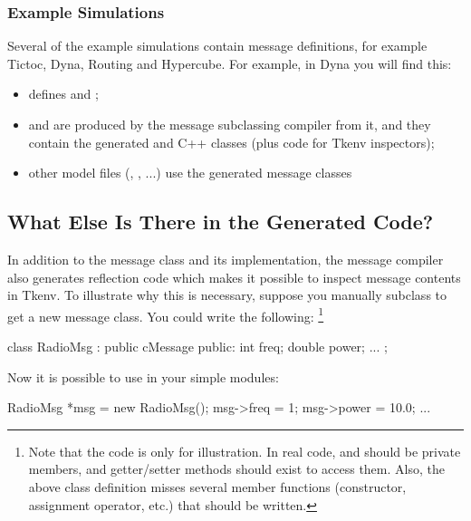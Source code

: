 \subsubsection{Example Simulations}

Several of the example simulations contain message definitions, for example
Tictoc, Dyna, Routing and Hypercube. For example, in Dyna you will find this:

\begin{itemize}
 \item {} defines  and ;
 \item {} and  are produced
   by the message subclassing compiler from it, and they contain
   the generated  and 
   C++ classes (plus code for Tkenv inspectors);
 \item other model files (, , ...)
   use the generated message classes
\end{itemize}



\subsection{What Else Is There in the Generated Code?}

In addition to the message class and its implementation,
the message compiler also generates reflection code which makes it
possible to inspect message contents in Tkenv.
To illustrate why this is necessary, suppose you manually subclass
 to get a new message class. You could write the following:
  \footnote{Note that the code is only for illustration.
  In real code,  and  should be private members,
  and getter/setter methods should exist to access them.
  Also, the above class definition misses several member functions
  (constructor, assignment operator, etc.) that should be written.}

\begin{cpp}
class RadioMsg : public cMessage
{
  public:
    int freq;
    double power;
    ...
};
\end{cpp}

Now it is possible to use  in your simple modules:

\begin{cpp}
RadioMsg *msg = new RadioMsg();
msg->freq = 1;
msg->power = 10.0;
...
\end{cpp}

